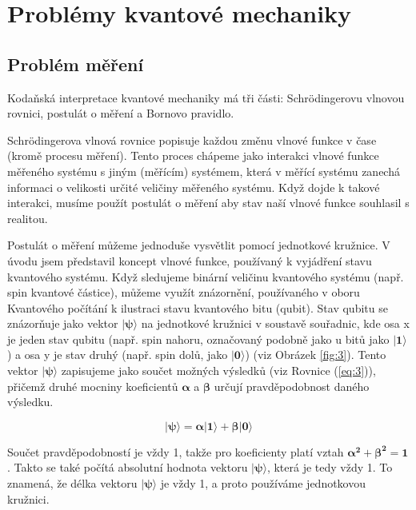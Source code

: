 \section{Problémy kvantové mechaniky}
    \subsection{Problém měření}
Kodaňská interpretace kvantové mechaniky má tři části: Schrödingerovu vlnovou rovnici, postulát o měření a Bornovo pravidlo.

Schrödingerova vlnová rovnice popisuje každou změnu vlnové funkce v čase (kromě procesu měření). Tento proces chápeme jako interakci vlnové funkce měřeného systému s jiným (měřícím) systé\-mem, která v měřící systému zanechá informaci o velikosti určité veličiny měřeného systému. Když dojde k takové interakci, musíme použít postulát o měření aby stav naší vlnové funkce souhlasil s realitou.

Postulát o měření můžeme jednoduše vysvětlit pomocí jednotkové kružnice. V úvodu jsem představil koncept vlnové funkce, používaný k vyjádření stavu kvantového systému. Když sledujeme binární veličinu kvantového systému (např. spin kvantové částice), můžeme využít znázorně\-ní, používaného v oboru Kvantového počítání k ilustraci stavu kvantového bitu (qubit). Stav qubitu se znázorňuje jako vektor $\bm{|\psi\rangle}$ na jednotkové kružnici v soustavě souřadnic, kde osa x je jeden stav qubitu (např. spin nahoru, označovaný podobně jako u bitů jako $\bm{|1\rangle}$) a osa y je stav druhý (např. spin dolů, jako $\bm{|0\rangle}$) (viz Obrázek \ref{fig:3}). Tento vektor $\bm{|\psi\rangle}$ zapisujeme jako součet možných výsledků (viz Rovnice (\ref{eq:3})), přičemž druhé mocniny koeficientů $\bm{\alpha}$ a $\bm{\beta}$ určují pravděpodobnost daného výsledku. 

\begin{equation}
    \bm{|\psi\rangle = \alpha|1\rangle + \beta|0\rangle}
    \label{eq:3}
\end{equation}

Součet pravděpodobností je vždy 1, takže pro koeficienty platí vztah $\bm{\alpha^2 + \beta^2 = 1}$. Takto se také počítá absolutní hodnota vektoru $\bm{|\psi\rangle}$, která je tedy vždy 1. To znamená, že délka vektoru $\bm{|\psi\rangle}$ je vždy 1, a proto používáme jednotkovou kružnici. 

